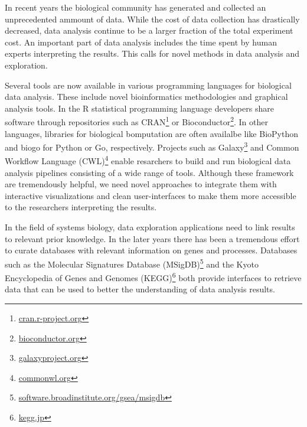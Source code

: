 In recent years the biological community has generated and collected an
unprecedented ammount of data. While the cost of data collection has
drastically decreased, data analysis continue to be a larger fraction of the
total experiment cost.\cite{sboner2011real}  An important part of data analysis
includes the time spent by human experts interpreting the results. This calls
for novel methods in data analysis and exploration. 

Several tools are now available in various programming languages for biological
data analysis. 
These include novel bioinformatics methodologies and graphical
analysis tools.
In the R statistical programming language developers share software through
repositories such as CRAN\footnote{\url{cran.r-project.org}} or
Bioconductor\footnote{\url{bioconductor.org}}.  In other languages, libraries
for biological bomputation are often availalbe like BioPython\cite{biopython}
and biogo\cite{biogo} for Python or Go, respectively. Projects such as
Galaxy\footnote{\url{galaxyproject.org}} and Common Workflow Language
(CWL)\footnote{\url{commonwl.org}} enable resarchers to build and run
biological data analysis pipelines consisting of a wide range of tools.
Although these framework are tremendously helpful, we need novel approaches
to integrate them with interactive visualizations and clean user-interfaces to
make them more accessible to the researchers interpreting the results. 

In the field of systems biology, data exploration applications need to link
results to relevant prior knowledge. In the later years there has been a
tremendous effort to curate databases with relevant information on genes and
processes. Databases such as the Molecular Signatures Database
(MSigDB)\footnote{\url{software.broadinstitute.org/gsea/msigdb}} and the Kyoto
Encyclopedia of Genes and Genomes (KEGG)\footnote{\url{kegg.jp}} both provide
interfaces to retrieve data that can be used to better the understanding of
data analysis results. 

